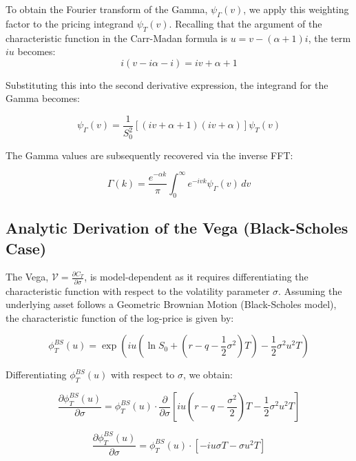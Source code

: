 \documentclass{article}
\begin{document}
To obtain the Fourier transform of the Gamma, $\psi_{\Gamma}(v)$, we apply this weighting factor to the pricing integrand $\psi_T(v)$. Recalling that the argument of the characteristic function in the Carr-Madan formula is $u = v - (\alpha+1)i$, the term $iu$ becomes:
$$ i(v - i\alpha - i) = iv + \alpha + 1 $$

Substituting this into the second derivative expression, the integrand for the Gamma becomes:

\begin{equation}
    \psi_{\Gamma}(v) = \frac{1}{S_0^2} \left[ (iv + \alpha + 1)(iv + \alpha) \right] \psi_T(v)
\end{equation}

The Gamma values are subsequently recovered via the inverse FFT:

\begin{equation}
    \Gamma(k) = \frac{e^{-\alpha k}}{\pi} \int_{0}^{\infty} e^{-ivk} \psi_{\Gamma}(v) \, dv
\end{equation}
\subsection{Analytic Derivation of the Vega (Black-Scholes Case)}

The Vega, $\mathcal{V} = \frac{\partial C_T}{\partial \sigma}$, is model-dependent as it requires differentiating the characteristic function with respect to the volatility parameter $\sigma$. Assuming the underlying asset follows a Geometric Brownian Motion (Black-Scholes model), the characteristic function of the log-price is given by:

\begin{equation}
    \phi_T^{BS}(u) = \exp \left( i u \left(\ln S_0 + (r - q - \frac{1}{2}\sigma^2)T \right) - \frac{1}{2} \sigma^2 u^2 T \right)
\end{equation}

Differentiating $\phi_T^{BS}(u)$ with respect to $\sigma$, we obtain:

\begin{equation}
    \frac{\partial \phi_T^{BS}(u)}{\partial \sigma} = \phi_T^{BS}(u) \cdot \frac{\partial}{\partial \sigma} \left[ i u (r - q - \frac{\sigma^2}{2})T - \frac{1}{2} \sigma^2 u^2 T \right]
\end{equation}

\begin{equation}
    \frac{\partial \phi_T^{BS}(u)}{\partial \sigma} = \phi_T^{BS}(u) \cdot \left[ -iu\sigma T - \sigma u^2 T \right]
\end{equation}
\end{document}
